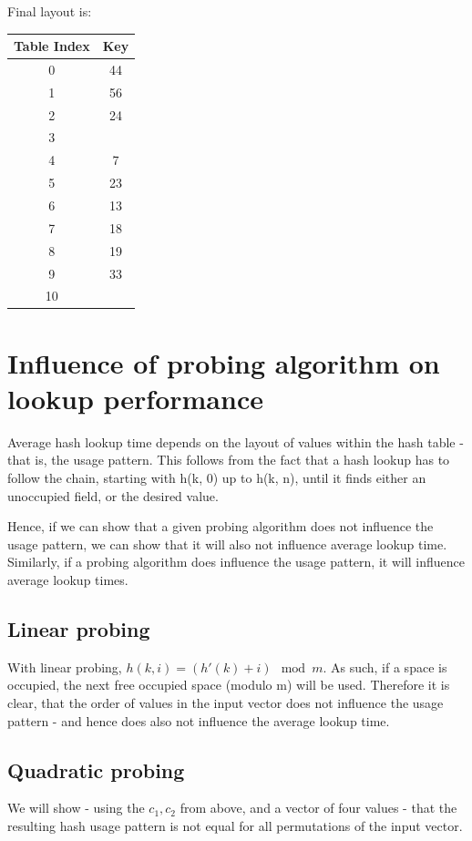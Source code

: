 \documentclass[a4paper]{scrartcl}
\begin{document}
Final layout is:

\begin{tabular}{|c|c|}
	\hline
	Table Index & Key \\
	\hline
	0 & 44 \\
	1 & 56 \\
	2 & 24 \\
	3 & \\
	4 & 7 \\
	5 & 23 \\
	6 & 13 \\
	7 & 18 \\
	8 & 19 \\
	9 & 33 \\
	10 & \\
	\hline
\end{tabular}

\section{Influence of probing algorithm on lookup performance}

Average hash lookup time depends on the layout of values within the hash table
- that is, the usage pattern. This follows from the fact that a hash lookup has
to follow the chain, starting with h(k, 0) up to h(k, n), until it finds either
an unoccupied field, or the desired value.

Hence, if we can show that a given probing algorithm does not influence the
usage pattern, we can show that it will also not influence average lookup time.
Similarly, if a probing algorithm does influence the usage pattern, it will
influence average lookup times.

\subsection{Linear probing}

With linear probing, $h(k, i) = (h'(k) + i) \mod m$. As such, if a space is
occupied, the next free occupied space (modulo m) will be used. Therefore it is
clear, that the order of values in the input vector does not influence the
usage pattern - and hence does also not influence the average lookup time.

\subsection{Quadratic probing}

We will show - using the $c_1, c_2$ from above, and a vector of four values -
that the resulting hash usage pattern is not equal for all permutations of
the input vector.
\end{document}
